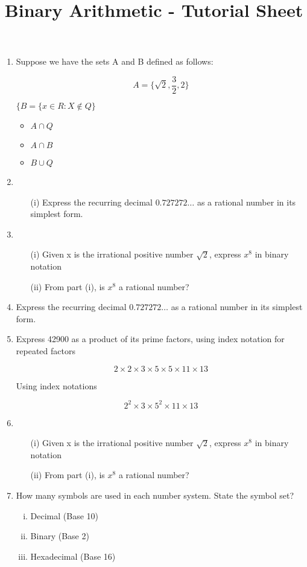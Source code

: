 \documentclass[]{article}
\title{Binary Arithmetic - Tutorial Sheet}
\begin{document}
\begin{enumerate}
    \item Suppose we have the sets A and B defined as follows:

\[ A = \{ \sqrt{2}, \frac{3}{2}, 2 \}\]

$ \{ B = \{ x \in R :  X \notin Q \}  $

\begin{itemize}
\item $A \cap Q$
\item $A \cap B$
\item $B \cup Q$
\end{itemize}

\item 
\begin{itemize}
	\item[(i)] Express the recurring decimal $0.727272\ldots$ as a rational number in its simplest form.
\end{itemize}
\item 
\begin{itemize}
\item[(i)] Given x is the irrational positive number $\sqrt{2}$, express $x^8$ in binary notation\\
\item[(ii)] From part (i), is $x^8$ a rational number?
\end{itemize}
\item Express the recurring decimal $0.727272\ldots$ as a rational number in its simplest form.

\item Express 42900 as a product of its prime factors, using index notation for repeated factors
\begin{framed}
\[
2 \times 2 \times 3 \times 5 \times 5 \times 11 \times 13 \]

Using index notations

\[2^2 \times 3 \times 5^2 \times 11 \times 13 \]
\end{framed}
\item 
\begin{itemize}
\item[(i)] Given x is the irrational positive number $\sqrt{2}$, express $x^8$ in binary notation\\
\item[(ii)] From part (i), is $x^8$ a rational number?
\end{itemize}



\item How many symbols are used in each number system. State the symbol set?

\begin{enumerate}[(i)]
\item Decimal (Base 10)
\item Binary (Base 2) 
\item Hexadecimal (Base 16)
\end{enumerate}


\end{enumerate}
\end{document}
